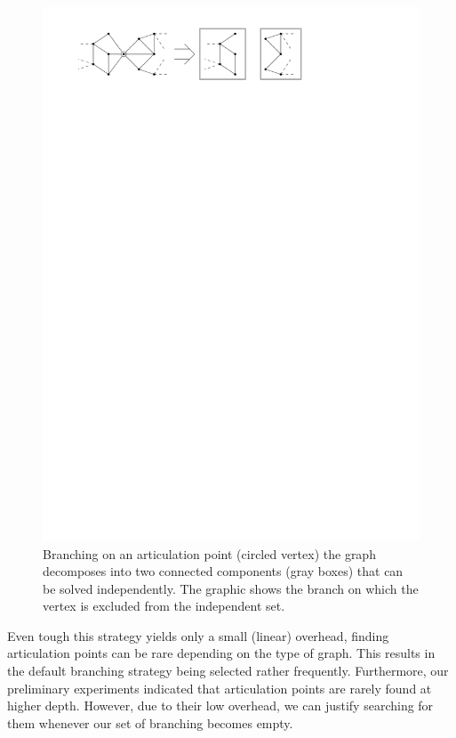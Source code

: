 \documentclass[a4paper,UKenglish,cleveref, autoref, thm-restate]{lipics-v2021}
\begin{document}
\begin{figure}[t]
  \centering
  \includegraphics[scale=1]{figures/articulation_points}
  \caption{Branching on an articulation point (circled vertex) the
    graph decomposes into two connected components (gray boxes) that can be
    solved independently. The graphic shows the branch on which the vertex is
    excluded from the independent set.}
  \label{fig:articulation_points}
\end{figure}

Even tough this strategy yields only a small (linear) overhead, finding articulation points can be rare depending on the type of graph.
This results in the default branching strategy being selected rather
frequently.
Furthermore, our preliminary experiments indicated that articulation points are rarely found at higher depth.
However, due to their low overhead, we can justify searching for them whenever our set of branching becomes empty.
\end{document}

